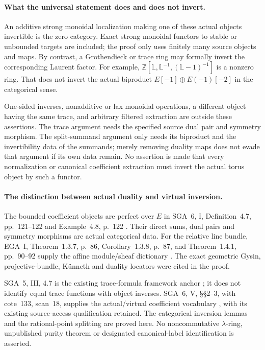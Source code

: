 \paragraph{What the universal statement does and does not invert.}
An additive strong monoidal localization making
one of these actual objects invertible is the
zero category. Exact strong monoidal functors
to stable or unbounded targets are included;
the proof only uses finitely many source objects
and maps.
By contrast, a Grothendieck or trace ring may
formally invert the corresponding Laurent factor.
For example,
\(\mathbb Z[\mathbb L,\mathbb L^{-1},
(\mathbb L-1)^{-1}]\) is a nonzero ring.
That does not invert the actual biproduct
\(E[-1]\oplus E(-1)[-2]\) in the categorical sense.

One-sided inverses, nonadditive or lax monoidal
operations, a different object having the same trace,
and arbitrary filtered extraction are outside
these assertions.
The trace argument needs the specified source
dual pair and symmetry morphism.
The split-summand argument only needs its biproduct
and the invertibility data of the summands; merely
removing duality maps does not evade that argument
if its own data remain.
No assertion is made that every normalization
or canonical coefficient extraction must invert
the actual torus object by such a functor.

\paragraph{The  distinction between actual duality and virtual inversion.}
The bounded coefficient objects are perfect over \(E\)
in SGA~6, I, Definition~4.7, pp.~121--122 and
Example~4.8, p.~122 \cite{SGA6}.
Their direct sums, dual pairs and symmetry morphisms
are actual categorical data.
For the relative line bundle, EGA~I,
Theorem~1.3.7, p.~86, Corollary~1.3.8, p.~87,
and Theorem~1.4.1, pp.~90--92 supply the
affine module/sheaf dictionary \cite{EGA}.
The exact geometric Gysin, projective-bundle,
K\"unneth and duality locators were cited in the proof.

SGA~5, III, 4.7 is the existing trace-formula
framework anchor \cite{SGA5}; it does not identify
equal trace functions with object inverses.
SGA~6, V, \S\S2--3, with cote~133, scan~18,
supplies the actual/virtual coefficient vocabulary
\cite{SGA6,Archive}, with its existing source-access
qualification retained.
The categorical inversion lemmas and the rational-point
splitting are proved here. No noncommutative
\(\lambda\)-ring, unpublished purity theorem or
designated canonical-label identification is asserted.
